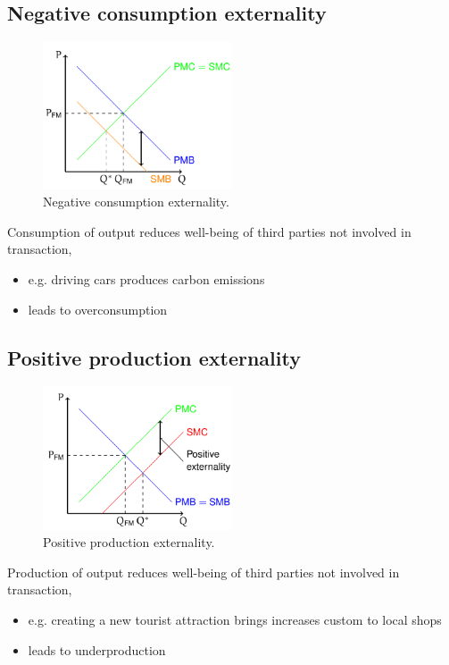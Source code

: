 \subsection{Negative consumption externality}
\begin{figure}[H]
  \centering
  \includegraphics[width = 0.5\textwidth]{./img/figure17.png}
  \caption{Negative consumption externality.}
\end{figure}
Consumption of output reduces well-being of third parties not involved in transaction,
\begin{itemize}
  \item e.g. driving cars produces carbon emissions
  \item leads to overconsumption
\end{itemize}
\subsection{Positive production externality}
\begin{figure}[H]
  \centering
  \includegraphics[width = 0.5\textwidth]{./img/figure18.png}
  \caption{Positive production externality.}
\end{figure}
Production of output reduces well-being of third parties not involved in transaction,
\begin{itemize}
  \item e.g. creating a new tourist attraction brings increases custom to local shops
  \item leads to underproduction
\end{itemize}
